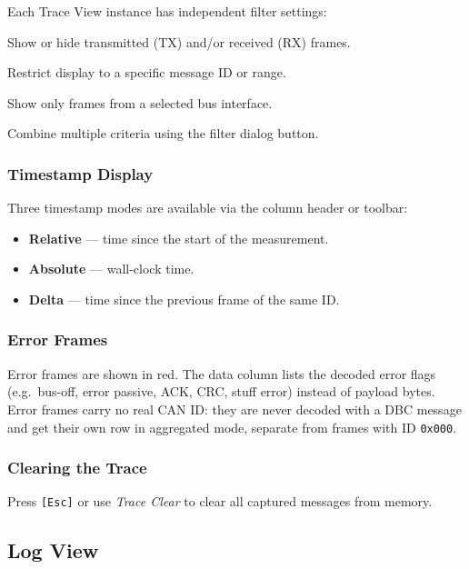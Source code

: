\documentclass[a4paper,11pt]{article}
\newcommand{\key}[1]{\texttt{\small[#1]}}
\newcommand{\menu}[1]{\textit{#1}}
\begin{document}
Each Trace View instance has independent filter settings:

\begin{description}[leftmargin=2em, style=nextline]
  \item[TX/RX toggle] Show or hide transmitted (TX) and/or received (RX) frames.
  \item[Message ID filter] Restrict display to a specific message ID or range.
  \item[Interface filter] Show only frames from a selected bus interface.
  \item[Advanced filter dialog] Combine multiple criteria using the filter dialog button.
\end{description}

\subsubsection{Timestamp Display}

Three timestamp modes are available via the column header or toolbar:
\begin{itemize}
  \item \textbf{Relative} — time since the start of the measurement.
  \item \textbf{Absolute} — wall-clock time.
  \item \textbf{Delta} — time since the previous frame of the same ID.
\end{itemize}

\subsubsection{Error Frames}

Error frames are shown in red. The data column lists the decoded error flags
(e.g.\ bus-off, error passive, ACK, CRC, stuff error) instead of payload bytes.
Error frames carry no real CAN ID: they are never decoded with a DBC message and
get their own row in aggregated mode, separate from frames with ID \texttt{0x000}.

\subsubsection{Clearing the Trace}

Press \key{Esc} or use \menu{Trace \textrightarrow{} Clear} to clear all captured messages
from memory.

\subsection{Log View}
\end{document}
